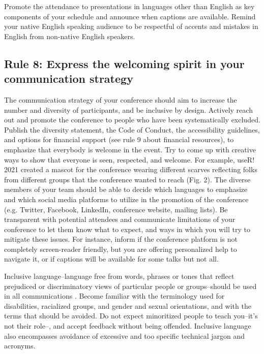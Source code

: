 \documentclass[10pt,letterpaper]{article}
\begin{document}
Promote the attendance to presentations in languages other than English as key components of your schedule and announce when captions are available. 
Remind your native English speaking audience to be respectful of accents and mistakes in English from non-native English speakers. 




\subsection*{Rule 8: Express the welcoming spirit in your communication strategy}
\label{rule_communication}

The communication strategy of your conference should aim to increase the number and diversity of participants, and be inclusive by design.
Actively reach out and promote the conference to people who have been systematically excluded. 
Publish the diversity statement, the Code of Conduct, the accessibility guidelines, and  options for financial support (see rule 9 about financial resources), to emphasize that everybody is welcome in the event.
Try to come up with creative ways to show that everyone is seen, respected, and welcome. For example, useR! 2021 created a mascot for the conference wearing different scarves reflecting folks from different groups that the conference wanted to reach (Fig. 2). 
The diverse members of your team should be able to decide which languages to emphasize and which social media platforms to utilize in the promotion of the conference (e.g. Twitter, Facebook, LinkedIn, conference website, mailing lists).
Be transparent with potential attendees and communicate limitations of your conference to let them know what to expect, and ways in which you will try to mitigate these issues. For instance, inform if the conference platform is not completely screen-reader friendly, but you are offering personalized help to navigate it, or if captions will be available for some talks but not all. %

Inclusive language--language free from words, phrases or tones that reflect prejudiced or discriminatory views of particular people or groups--should be used in all communications \cite{hallDesigningDiversityInclusion2019}. 
Become familiar with the terminology used for disabilities, racialized groups, and gender and sexual orientations, and with the terms that should be avoided. %
Do not expect minoritized people to teach you--it's not their role--, and accept feedback without being offended.
Inclusive language also encompasses avoidance of excessive and too specific technical jargon and acronyms. 
\end{document}
